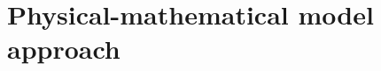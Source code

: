 \documentclass[
oneside,
a4paper,
12pt,
titlepage]
{article}
\begin{document}
% 
% 

\newpage
\pagestyle{standard}


% 
% 

\section{Physical-mathematical model approach}


\newpage

\end{document}
